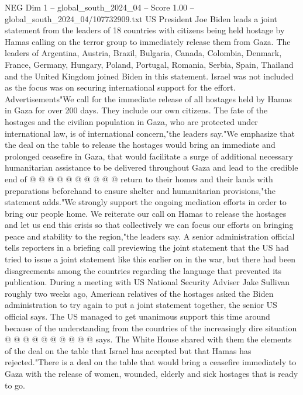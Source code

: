 \begin{textsample}{NEG Dim 1 – global\_south\_2024\_04 – Score 1.00 – global\_south\_2024\_04/107732909.txt}  \label{ex:f1_neg_411}
US President Joe Biden leads a joint statement from the leaders of 18 countries with citizens being held hostage by Hamas calling on the terror group to immediately release them from Gaza.
The leaders of Argentina, Austria, Brazil, Bulgaria, Canada, Colombia, Denmark, France, Germany, Hungary, Poland, Portugal, Romania, Serbia, Spain, Thailand and the United Kingdom joined Biden in this statement.
Israel was not included as the focus was on securing international support for the effort.
Advertisements"We call for the immediate release of all hostages held by Hamas in Gaza for over 200 days.
They include our own citizens.
The fate of the hostages and the civilian population in Gaza, who are protected under international law, is of international concern,"the leaders say."We emphasize that the deal on the table to release the hostages would bring an immediate and prolonged ceasefire in Gaza, that would facilitate a surge of additional necessary humanitarian assistance to be delivered throughout Gaza and lead to the credible end of @ @ @ @ @ @ @ @ @ @ return to their homes and their lands with preparations beforehand to ensure shelter and humanitarian provisions,"the statement adds."We strongly support the ongoing mediation efforts in order to bring our people home.
We reiterate our call on Hamas to release the hostages and let us end this crisis so that collectively we can focus our efforts on bringing peace and stability to the region,"the leaders say.
A senior administration official tells reporters in a briefing call previewing the joint statement that the US had tried to issue a joint statement like this earlier on in the war, but there had been disagreements among the countries regarding the language that prevented its publication.
During a meeting with US National Security Adviser Jake Sullivan roughly two weeks ago, American relatives of the hostages asked the Biden administration to try again to put a joint statement together, the senior US official says.
The US managed to get unanimous support this time around because of the understanding from the countries of the increasingly dire situation @ @ @ @ @ @ @ @ @ @ says.
The White House shared with them the elements of the deal on the table that Israel has accepted but that Hamas has rejected."There is a deal on the table that would bring a ceasefire immediately to Gaza with the release of women, wounded, elderly and sick hostages that is ready to go.

\end{textsample}
